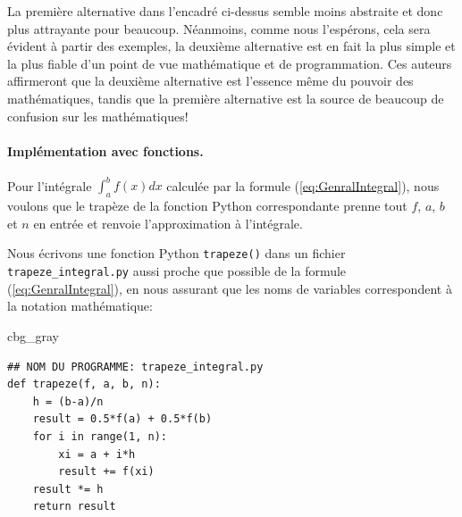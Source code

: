 \documentclass[%
oneside,                 %
final,                   %
10pt]{article}
\newenvironment{_cod_tight}[1]{
   \def\FrameCommand{\colorbox{#1}}
   \FrameRule0.6pt\MakeFramed {\FrameRestore}\vskip3mm}
   {\vskip0mm\endMakeFramed}
\newenvironment{cod}[1]{
\bgroup\rmfamily
\fboxsep=0mm\relax
\begin{_cod_tight}{#1}
\list{}{\parsep=-2mm\parskip=0mm\topsep=0pt\leftmargin=2mm
\rightmargin=2\leftmargin\leftmargin=4pt\relax}
\item\relax}
{\endlist\end{_cod_tight}\egroup}
\begin{document}
La première alternative dans l'encadré ci-dessus semble moins abstraite et donc plus attrayante pour beaucoup. Néanmoins, comme nous l'espérons, cela sera évident à partir des exemples, la deuxième alternative est en fait la plus simple et la plus fiable d'un point de vue mathématique et de programmation. Ces auteurs affirmeront que la deuxième alternative est l'essence même du pouvoir des mathématiques, tandis que la première alternative est la source de beaucoup de confusion sur les mathématiques!
\paragraph{Implémentation avec fonctions.}
Pour l'intégrale $\int_a^bf(x)dx$ calculée par la formule (\ref{eq:GenralIntegral}), nous voulons que le trapèze de la fonction Python correspondante prenne tout $f$, $a$, $b$ et $n$ en entrée et renvoie l'approximation à l'intégrale.

Nous écrivons une fonction Python \texttt{trapeze()} dans un fichier \Verb!trapeze_integral.py! aussi proche que possible de la formule (\ref{eq:GenralIntegral}), en nous assurant que les noms de variables correspondent à la notation mathématique:

\begin{cod}{cbg_gray}\begin{verbatim}
## NOM DU PROGRAMME: trapeze_integral.py
def trapeze(f, a, b, n):
    h = (b-a)/n
    result = 0.5*f(a) + 0.5*f(b)
    for i in range(1, n):
        xi = a + i*h
        result += f(xi)
    result *= h
    return result
\end{verbatim}
\end{cod}
\noindent
\end{document}
